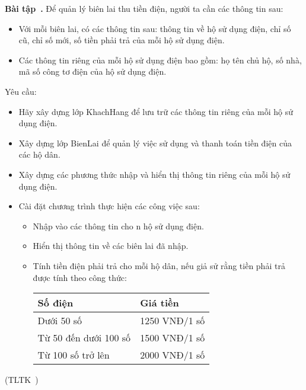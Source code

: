 \documentclass[12pt,a4paper]{article}
\newcounter{exercise}[section]
\newenvironment{exercise}[1][]{\refstepcounter{exercise}\par\medskip\textbf{Bài tập~\theexercise. #1} \rmfamily}{\medskip}
\newcommand{\reference}[1]{(TLTK~#1)}
\begin{document}
    \begin{exercise}
        Để quản lý biên lai thu tiền điện, người ta cần các thông tin sau:
            \begin{itemize}
                \item Với mỗi biên lai, có các thông tin sau: thông tin về hộ sử dụng điện, chỉ số cũ, chỉ số mới, số tiền phải trả của mỗi hộ sử dụng điện.
                \item Các thông tin riêng của mỗi hộ sử dụng điện bao gồm: họ tên chủ hộ, số nhà, mã số công tơ điện của hộ sử dụng điện.
            \end{itemize}

        Yêu cầu:
            \begin{itemize}
                \item Hãy xây dựng lớp KhachHang để lưu trữ các thông tin riêng của mỗi hộ sử dụng điện.
                \item Xây dựng lớp BienLai để quản lý việc sử dụng và thanh toán tiền điện của các hộ dân.
                \item Xây dựng các phương thức nhập và hiển thị thông tin riêng của mỗi hộ sử dụng điện.
                \item Cài đặt chương trình thực hiện các công việc sau:
                    \begin{itemize}
                        \item Nhập vào các thông tin cho n hộ sử dụng điện.
                        \item Hiển thị thông tin về các biên lai đã nhập.
                        \item Tính tiền điện phải trả cho mỗi hộ dân, nếu giả sử rằng tiền phải trả được tính theo công thức:
                            \begin{center}
                                \begin{tabular}{|l|l|}
                                    \hline
                                    \textbf{Số điện} & \textbf{Giá tiền}\\
                                    \hline
                                    Dưới 50 số & 1250 VNĐ/1 số\\
                                    \hline
                                    Từ 50 đến dưới 100 số & 1500 VNĐ/1 số\\
                                    \hline
                                    Từ 100 số trở lên & 2000 VNĐ/1 số\\
                                    \hline
                                    \end{tabular}
                            \end{center}
                    \end{itemize}
            \end{itemize}

            \reference{\cite{123doc.org}}
    \end{exercise}
\end{document}
